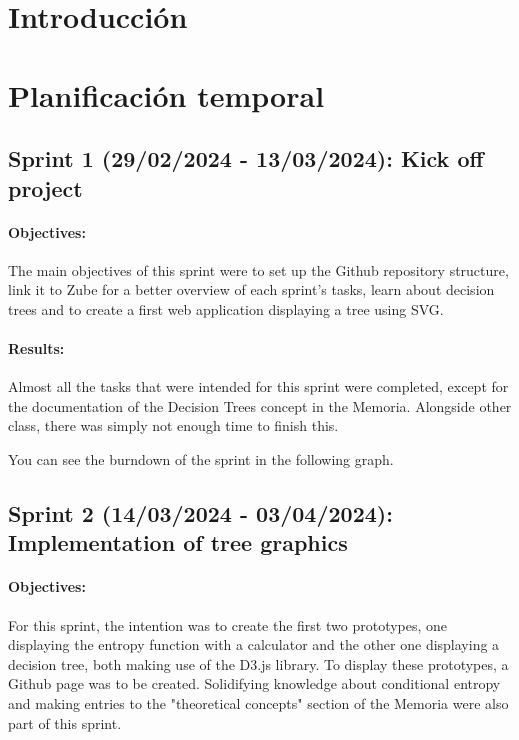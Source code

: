 
\section{Introducción}

\section{Planificación temporal}
\subsection{Sprint 1 (29/02/2024 - 13/03/2024): Kick off project}
\paragraph{Objectives:}
The main objectives of this sprint were to set up the Github repository structure, link it to Zube for a better overview of each sprint's tasks, learn about decision trees and to create a first web application displaying a tree using SVG.

\paragraph{Results:}
Almost all the tasks that were intended for this sprint were completed, except for the documentation of the Decision Trees concept in the Memoria. Alongside other class, there was simply not enough time to finish this.

You can see the burndown of the sprint in the following graph.

\subsection{Sprint 2 (14/03/2024 - 03/04/2024): Implementation of tree graphics}
\paragraph{Objectives:}
For this sprint, the intention was to create the first two prototypes, one displaying the entropy function with a calculator and the other one displaying a decision tree, both making use of the D3.js library. To display these prototypes, a Github page was to be created. Solidifying knowledge about conditional entropy and making entries to the "theoretical concepts" section of the Memoria were also part of this sprint. 

